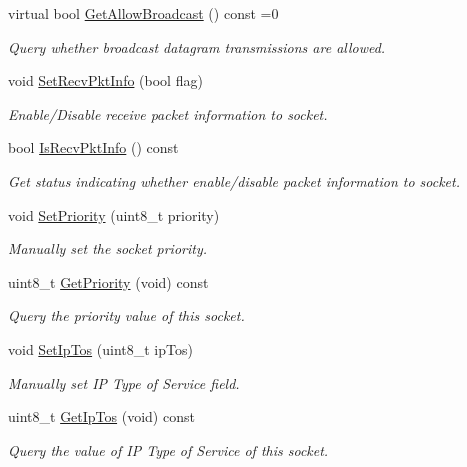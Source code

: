 \begin{DoxyCompactItemize}
virtual bool \hyperlink{classns3_1_1Socket_a95338a1ac89330a492d6af5b4e172d34}{Get\+Allow\+Broadcast} () const =0
\begin{DoxyCompactList}\small\item\em Query whether broadcast datagram transmissions are allowed. \end{DoxyCompactList}\item 
void \hyperlink{classns3_1_1Socket_a340563e2858d7375ab0aa160a9557fff}{Set\+Recv\+Pkt\+Info} (bool flag)
\begin{DoxyCompactList}\small\item\em Enable/\+Disable receive packet information to socket. \end{DoxyCompactList}\item 
bool \hyperlink{classns3_1_1Socket_a104a42cdf0290b4e8867b4c0a77aadc2}{Is\+Recv\+Pkt\+Info} () const 
\begin{DoxyCompactList}\small\item\em Get status indicating whether enable/disable packet information to socket. \end{DoxyCompactList}\item 
void \hyperlink{classns3_1_1Socket_a904573518e0279618dbcb49f085d0fd6}{Set\+Priority} (uint8\+\_\+t priority)
\begin{DoxyCompactList}\small\item\em Manually set the socket priority. \end{DoxyCompactList}\item 
uint8\+\_\+t \hyperlink{classns3_1_1Socket_a3e4788d61c0e841ccaa1c7fce6fda2c1}{Get\+Priority} (void) const 
\begin{DoxyCompactList}\small\item\em Query the priority value of this socket. \end{DoxyCompactList}\item 
void \hyperlink{classns3_1_1Socket_a2a21a2d166ec2adf766b84d984d1cf65}{Set\+Ip\+Tos} (uint8\+\_\+t ip\+Tos)
\begin{DoxyCompactList}\small\item\em Manually set IP Type of Service field. \end{DoxyCompactList}\item 
uint8\+\_\+t \hyperlink{classns3_1_1Socket_a95bd4732074d3d26d4a6949fc3499ccb}{Get\+Ip\+Tos} (void) const 
\begin{DoxyCompactList}\small\item\em Query the value of IP Type of Service of this socket. \end{DoxyCompactList}\item 

\end{DoxyCompactItemize}
